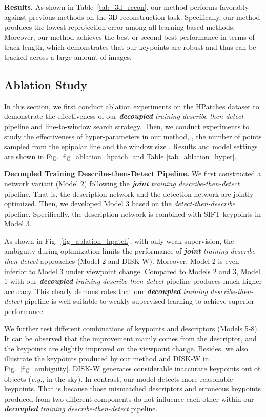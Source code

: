 \documentclass[10pt,twocolumn,letterpaper]{article}
\begin{document}
\noindent\textbf{Results.} As shown in Table~\ref{tab_3d_recon}, our method performs favorably against previous methods on the 3D reconstruction task. Specifically, our method produces the lowest reprojection error among all learning-based methods.
Moreover, our method achieves the best or second best performance in terms of track length, which demonstrates that our keypoints are robust and thus can be tracked across a large amount of images. 


\subsection{Ablation Study}
In this section, we first conduct ablation experiments on the HPatches dataset  \cite{hpatches_2017_cvpr}  to demonstrate the effectiveness of our \textit{\textbf{decoupled} training describe-then-detect} pipeline and line-to-window search strategy. Then, we conduct experiments to study the effectiveness of hyper-parameters in our method, \ie, the number of points sampled from the epipolar line  and the window size . Results and model settings are shown in Fig. \ref{fig_ablation_hpatch} and Table \ref{tab_ablation_hyper}. 

\noindent\textbf{\textbf{Decoupled} Training Describe-then-Detect Pipeline.}
\label{ablation_2stage}
We first constructed a network variant (Model 2)  following the \textit{\textbf{joint} training describe-then-detect} pipeline. That is, the description network and the detection network are jointly optimized. 
Then, we developed Model 3 based on the \textit{detect-then-describe} pipeline. Specifically, the description network is combined with SIFT keypoints in Model 3.

As shown in Fig.~\ref{fig_ablation_hpatch}, with only weak supervision, the ambiguity during optimization limits the performance of \textit{\textbf{joint} training  describe-then-detect} approaches (Model 2 and DISK-W). Moreover, Model 2 is even inferior to Model 3 under viewpoint change. 
Compared to Models 2 and 3, Model 1 with our \textit{\textbf{decoupled} training describe-then-detect} pipeline produces much higher accuracy. 
This clearly demonstrates that our \textit{\textbf{decoupled} training describe-then-detect} pipeline is well suitable to weakly supervised learning to achieve superior performance.

We further test different combinations of keypoints and descriptors (Models 5-8). It can be observed that the improvement mainly comes from the descriptor, and the keypoints are slightly improved on the viewpoint change. Besides, we also illustrate the keypoints produced by our method and DISK-W in Fig.~\ref{fig_ambiguity}. DISK-W generates considerable inaccurate keypoints out of objects (\emph{e.g.}, in the sky). In contrast, our model detects more reasonable keypoints. That is because those mismatched descriptors and erroneous keypoints produced from two different components do not influence each other within our \textit{\textbf{decoupled} training describe-then-detect} pipeline.
\end{document}
